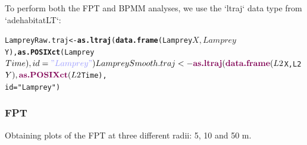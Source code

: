 \documentclass[10pt]{article}\usepackage{graphicx, color}
\makeatletter
\newcommand{\hlfunctioncall}[1]{\textcolor[rgb]{0.501960784313725,0,0.329411764705882}{\textbf{#1}}}%
\newcommand{\hlstring}[1]{\textcolor[rgb]{0.6,0.6,1}{#1}}%
\newenvironment{kframe}{%
 \def\at@end@of@kframe{}%
 \ifinner\ifhmode%
  \def\at@end@of@kframe{\end{minipage}}%
  \begin{minipage}{\columnwidth}%
 \fi\fi%
 \def\FrameCommand##1{\hskip\@totalleftmargin \hskip-\fboxsep
 \colorbox{shadecolor}{##1}\hskip-\fboxsep
     \hskip-\linewidth \hskip-\@totalleftmargin \hskip\columnwidth}%
 \MakeFramed {\advance\hsize-\width
   \@totalleftmargin\z@ \linewidth\hsize
   \@setminipage}}%
 {\par\unskip\endMakeFramed%
 \at@end@of@kframe}
\newenvironment{knitrout}{}{} %
\makeatother
\begin{document}
To perform both the FPT and BPMM analyses, we use the `ltraj` data type from `adehabitatLT`:

\begin{knitrout}
\color{fgcolor}\begin{kframe}
\begin{alltt}
LampreyRaw.traj <- \hlfunctioncall{as.ltraj}(\hlfunctioncall{data.frame}(Lamprey$X, Lamprey$Y), \hlfunctioncall{as.POSIXct}(Lamprey$Time), 
    id = \hlstring{"Lamprey"})
LampreySmooth.traj <- \hlfunctioncall{as.ltraj}(\hlfunctioncall{data.frame}(L2$X, L2$Y), \hlfunctioncall{as.POSIXct}(L2$Time), 
    id = \hlstring{"Lamprey"})
\end{alltt}
\end{kframe}
\end{knitrout}


\subsubsection{FPT}

Obtaining plots of the FPT at three different radii: 5, 10 and 50 m.  
\end{document}
